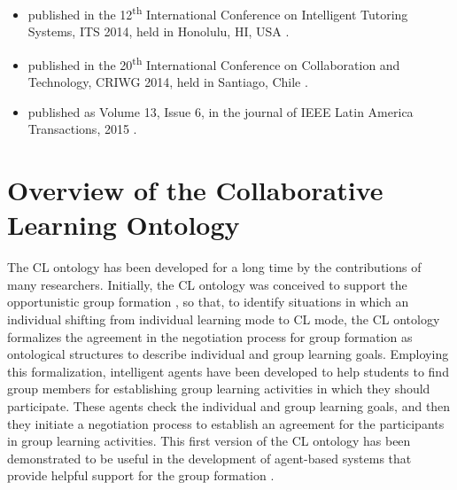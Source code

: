 \begin{itemize}
\item
{} published in the 12\textsuperscript{th} International Conference on Intelligent Tutoring Systems, ITS 2014, held in Honolulu, HI, USA \cite{ChallcoMoreiraMizoguchiIsotani2014a}.

\item
{} published in the 20\textsuperscript{th} International Conference on Collaboration and Technology, CRIWG 2014, held in Santiago, Chile \cite{ChallcoMoreiraMizoguchiIsotani2014}.

\item
{} published as Volume 13, Issue 6, in the journal of IEEE Latin America Transactions, 2015 \cite{ChallcoMoreiraBittencourtMizoguchiIsotani2015}.
\end{itemize}


\section{Overview of the Collaborative Learning Ontology}
\label{sec:overview-of-cl-ontology}

The CL ontology has been developed for a long time by the contributions of many researchers.
Initially, the CL ontology was conceived to support the opportunistic group formation \cite{IkedaGoMizoguchi1997}, so that, to identify situations in which an individual shifting from individual learning mode to CL mode, the CL ontology formalizes the agreement in the negotiation process for group formation as ontological structures to describe individual and group learning goals.
Employing this formalization, intelligent agents have been developed to help students to find group members for establishing group learning activities in which they should participate.
These agents check the individual and group learning goals, and then they initiate a negotiation process to establish an agreement for the participants in group learning activities.
This first version of the CL ontology has been demonstrated to be useful in the development of agent-based systems that provide helpful support for the group formation \cite{InabaOhkuboIkedaMizoguchiToyoda2001, SupnithiInabaIkedaMizoguchi1999}.

